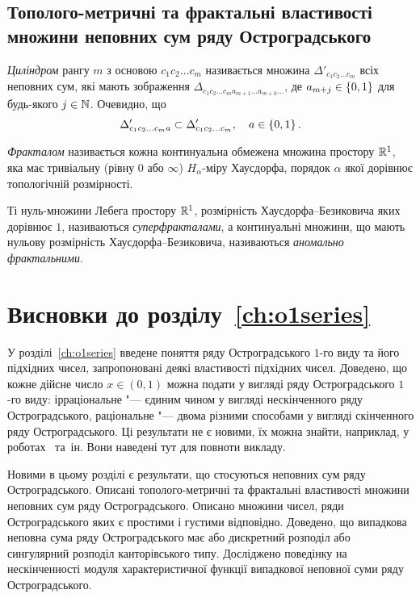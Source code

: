 \subsection{Тополого-метричні та фрактальні властивості множини
неповних сум ряду Остроградського}

\emph{Циліндром} рангу $m$ з основою $c_1c_2\dots c_m$ називається
множина $\Delta'_{c_1c_2\dots c_m}$ всіх неповних сум, які мають
зображення $\Delta_{c_1c_2\dots c_ma_{m+1}\dots a_{m+k}\dots}$, де
$a_{m+j}\in\left\{0,1\right\}$ для будь-якого $j\in\mathbb{N}$. Очевидно, що
\[
\Delta'_{c_1c_2\dots c_ma}\subset\Delta'_{c_1c_2\dots c_m}, \quad
a\in\left\{0,1\right\}.
\]

\begin{definition}
\emph{Фракталом} називається кожна континуальна обмежена множина
простору $\mathbb{R}^1$, яка має тривіальну (рівну $0$ або $\infty$)
$H_\alpha$-міру Хаусдорфа, порядок $\alpha$ якої дорівнює
топологічній розмірності.
\end{definition}

Ті нуль-множини Лебега простору $\mathbb{R}^1$, розмірність
Хаусдорфа\nobreakdash--\hspace{0pt}Безиковича яких дорівнює $1$,
називаються \emph{суперфракталами}, а континуальні множини, що
мають нульову розмірність Хаусдорфа--Безиковича, називаються
\emph{аномально фрактальними}.


\section*{Висновки до розділу~\ref{ch:o1series}}

У розділі~\ref{ch:o1series} введене поняття ряду Остроградського
$1$-го виду та його підхідних чисел, запропоновані деякі
властивості підхідних чисел. Доведено, що кожне дійсне число
$x\in(0,1)$ можна подати у вигляді ряду Остроградського $1$-го
виду: ірраціональне "--- єдиним чином у вигляді нескінченного ряду
Остроградського, раціональне "--- двома різними способами у
вигляді скінченного ряду Остроградського. Ці результати не є
новими, їх можна знайти, наприклад, у
роботах~\cite{Rem51,Sie11STNW,Pie29,VaZ75,Sha86} та~ін. Вони
наведені тут для повноти викладу.

Новими в цьому розділі є результати, що стосуються неповних сум
ряду Остроградського. Описані тополого-метричні та фрактальні
властивості множини неповних сум ряду Остроградського. Описано
множини чисел, ряди Остроградського яких є простими і густими
відповідно. Доведено, що випадкова неповна сума ряду
Остроградського має або дискретний розподіл або сингулярний
розподіл канторівського типу. Досліджено поведінку на
нескінченності модуля характеристичної функції випадкової неповної
суми ряду Остроградського.

